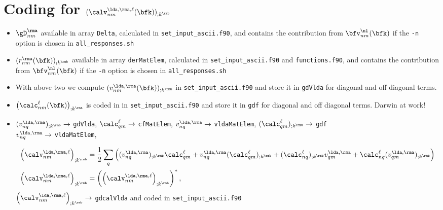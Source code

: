 \section{Coding for $(\calv^{\lda,\rma,\ell}_{nm}(\bfk))_{;k^\rmb}$}
\begin{itemize}
\item $\gD^\rma_{nm}$ available in array \verb=Delta=, 
calculated in \verb=set_input_ascii.f90=,
 and contains the
  contribution from $\bfv^\nl_{nm}(\bfk)$ if the \verb=-n= option is
  chosen in \verb=all_responses.sh= 
\item $(r^\rma_{nm}(\bfk))_{;k^\rmb}$
 available in array
  \verb=derMatElem=,
calculated in \verb=set_input_ascii.f90= and \verb=functions.f90=,
 and contains the
  contribution from $\bfv^\nl_{nm}(\bfk)$ if the \verb=-n= option is
  chosen in \verb=all_responses.sh= 
\item With above two we compute $(v^{\lda,\rma}_{nm}(\bfk))_{;k^\rmb}$ 
in \verb=set_input_ascii.f90=  and store it in \verb=gdVlda= for
diagonal and off diagonal terms.
\item $\big(\calc^\ell_{nm}(\bfk)\big)_{;k^\rma}$ is coded in 
in \verb=set_input_ascii.f90=  and store it in \verb=gdf= for
diagonal and off diagonal terms. Darwin at work!
\item $(v^{\lda,\rma}_{nq})_{;k^\rmb}\to$ \verb=gdVlda=,
  $\calc^\ell_{qm}\to$ \verb=cfMatElem=,
$v^{\lda,\rma}_{nq}\to$ \verb=vldaMatElem=, 
$(\calc^\ell_{qm})_{;k^\rmb}\to$
\verb=gdf=\\
 $v^{\lda,\rma}_{nq}\to$ \verb=vldaMatElem=,

 \begin{align}\label{c-a.2nn}
\left(\calv^{\lda,\rma,\ell}_{nm}\right)_{;k^\rmb}
&=
\frac{1}{2}\sum_q\left(
(v^{\lda,\rma}_{nq})_{;k^\rmb}\calc^\ell_{qm}
+ 
v^{\lda,\rma}_{nq}(\calc^\ell_{qm})_{;k^\rmb}
+
(\calc^\ell_{nq})_{;k^\rmb} v^{\lda,\rma}_{qm}
+
\calc^\ell_{nq} (v^{\lda,\rma}_{qm})_{;k^\rmb}
\right)
\nonumber\\
\left(\calv^{\lda,\rma,\ell}_{mn}\right)_{;k^\rmb}&=\left(\left(\calv^{\lda,\rma,\ell}_{nm}\right)_{;k^\rmb}\right)^*
,
\end{align} 
$\left(\calv^{\lda,\rma,\ell}_{nm}\right)_{;k^\rmb}\to$
\verb=gdcalVlda= and coded in \verb=set_input_ascii.f90=
\end{itemize}

